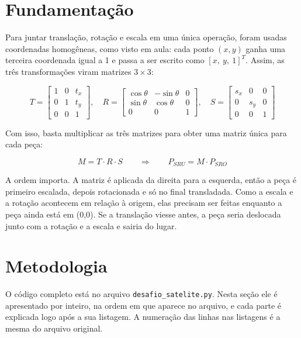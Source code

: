 \documentclass{article}
\begin{document}
\section{Fundamentação}

Para juntar translação, rotação e escala em uma única operação, foram usadas coordenadas homogêneas, como visto em aula: cada ponto $(x, y)$ ganha uma terceira coordenada igual a 1 e passa a ser escrito como $[x,\ y,\ 1]^T$. Assim, as três transformações viram matrizes $3\times3$:

\begin{equation}\label{eq:matrizes}
T = \begin{bmatrix} 1 & 0 & t_x \\ 0 & 1 & t_y \\ 0 & 0 & 1 \end{bmatrix}, \quad
R = \begin{bmatrix} \cos\theta & -\sin\theta & 0 \\ \sin\theta & \cos\theta & 0 \\ 0 & 0 & 1 \end{bmatrix}, \quad
S = \begin{bmatrix} s_x & 0 & 0 \\ 0 & s_y & 0 \\ 0 & 0 & 1 \end{bmatrix}
\end{equation}

Com isso, basta multiplicar as três matrizes para obter uma matriz única para cada peça:

\begin{equation}\label{eq:trs}
M = T \cdot R \cdot S \qquad \Rightarrow \qquad P_{SRU} = M \cdot P_{SRO}
\end{equation}

A ordem importa. A matriz é aplicada da direita para a esquerda, então a peça é primeiro escalada, depois rotacionada e só no final transladada. Como a escala e a rotação acontecem em relação à origem, elas precisam ser feitas enquanto a peça ainda está em (0,0). Se a translação viesse antes, a peça seria deslocada junto com a rotação e a escala e sairia do lugar.

\section{Metodologia}

O código completo está no arquivo \texttt{desafio\_satelite.py}. Nesta seção ele é apresentado por inteiro, na ordem em que aparece no arquivo, e cada parte é explicada logo após a sua listagem. A numeração das linhas nas listagens é a mesma do arquivo original.
\end{document}
